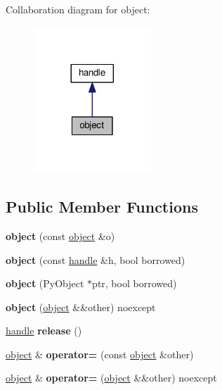 Collaboration diagram for object\+:
\nopagebreak
\begin{figure}[H]
\begin{center}
\leavevmode
\includegraphics[width=125pt]{classobject__coll__graph}
\end{center}
\end{figure}
\subsection*{Public Member Functions}
\begin{DoxyCompactItemize}
\item 
{\bfseries object} (const \hyperlink{classobject}{object} \&o)\hypertarget{classobject_a6537d8aee1fc94555af84e5bb9ecad21}{}\label{classobject_a6537d8aee1fc94555af84e5bb9ecad21}

\item 
{\bfseries object} (const \hyperlink{classhandle}{handle} \&h, bool borrowed)\hypertarget{classobject_a03bdae2b50b8b2fa787461ea7efc1b17}{}\label{classobject_a03bdae2b50b8b2fa787461ea7efc1b17}

\item 
{\bfseries object} (Py\+Object $\ast$ptr, bool borrowed)\hypertarget{classobject_aa37d7467c96c820b98f7e1b51e9c8a91}{}\label{classobject_aa37d7467c96c820b98f7e1b51e9c8a91}

\item 
{\bfseries object} (\hyperlink{classobject}{object} \&\&other) noexcept\hypertarget{classobject_a3fc437bccb86b745433164bc3a04a2a4}{}\label{classobject_a3fc437bccb86b745433164bc3a04a2a4}

\item 
\hyperlink{classhandle}{handle} {\bfseries release} ()\hypertarget{classobject_a4ce66b1d44b37ae6b28e80228b075aae}{}\label{classobject_a4ce66b1d44b37ae6b28e80228b075aae}

\item 
\hyperlink{classobject}{object} \& {\bfseries operator=} (const \hyperlink{classobject}{object} \&other)\hypertarget{classobject_a77c0e831678400d37745600204f85e14}{}\label{classobject_a77c0e831678400d37745600204f85e14}

\item 
\hyperlink{classobject}{object} \& {\bfseries operator=} (\hyperlink{classobject}{object} \&\&other) noexcept\hypertarget{classobject_a3f06d0eea159fe5bc18a96483a7438f2}{}\label{classobject_a3f06d0eea159fe5bc18a96483a7438f2}

\end{DoxyCompactItemize}
